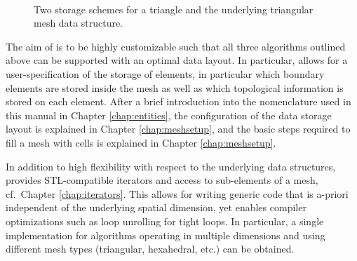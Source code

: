 \begin{figure}[bt]
 \centering
\mbox{
 \hspace{0.5cm}
 }
 \caption{Two storage schemes for a triangle and the underlying triangular mesh data structure.}
 \label{fig:storage-schemes-triangle}
\end{figure}

The aim of {\ViennaGrid} is to be highly customizable such that all three algorithms outlined above can be supported with an optimal data layout.
In particular, {\ViennaGrid} allows for a user-specification of the storage of elements, in particular which boundary elements are stored inside the mesh as well as which topological information is stored on each element.
After a brief introduction into the nomenclature used in this manual in Chapter \ref{chap:entities}, the configuration of the data storage layout is explained in Chapter \ref{chap:meshsetup}, and the basic steps required to fill a mesh with cells is explained in Chapter \ref{chap:meshsetup}.

In addition to high flexibility with respect to the underlying data structures, {\ViennaGrid} provides STL-compatible iterators and access to sub-elements of a mesh, cf.~Chapter \ref{chap:iterators}.
This allows for writing generic code that is a-priori independent of the underlying spatial dimension, yet enables compiler optimizations such as loop unrolling for tight loops.
In particular, a single implementation for algorithms operating in multiple dimensions and using different mesh types (triangular, hexahedral, etc.) can be obtained.


